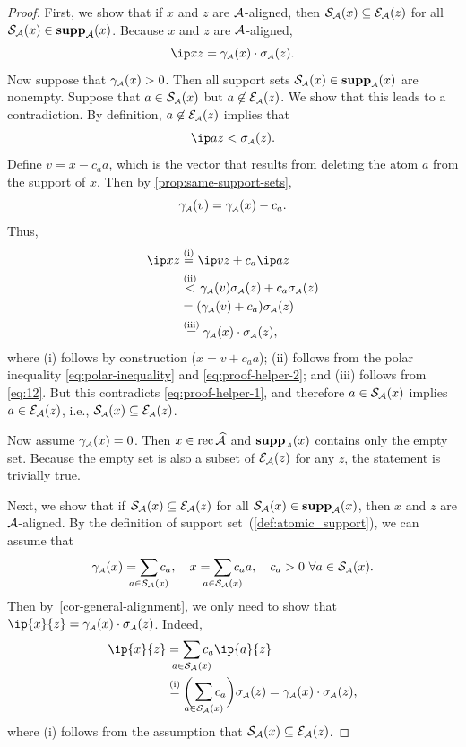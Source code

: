 \begin{proof}
  First, we show that if $x$ and $z$ are $\mathcal{A}$-aligned, then $\mathcal{S}_{\mathcal{A}}(x)
  \subseteq \mathcal{E}_{\mathcal{A}}(z)$ for all $\mathcal{S}_{\mathcal{A}}(x)\in \operatorname{\hbox{\rm\textbf{supp}}}_{\mathcal{A}}(x)$. Because
  $x$ and $z$ are $\mathcal{A}$-aligned,
  \begin{equation}
    \ip x z = \gamma\As(x)\cdot\sigma\As(z).
    \label{eq:proof-helper-1}
  \end{equation}
  Now suppose that $\gamma_{\scriptscriptstyle\mathcal{A}}(x) > 0$. Then all support sets
  $\mathcal{S}_{\scriptscriptstyle\mathcal{A}}(x) \in \operatorname{\hbox{\rm\textbf{supp}}}_{\scriptscriptstyle\mathcal{A}}(x)$ are nonempty. Suppose that
  $a\in \mathcal{S}_{\scriptscriptstyle\mathcal{A}}(x)$ but $a\not \in\mathcal{E}_{\scriptscriptstyle\mathcal{A}}(z)$. We show that
  this leads to a contradiction. By definition, $a\not\in\mathcal{E}_{\scriptscriptstyle\mathcal{A}}(z)$
  implies that
  \begin{equation}
    \ip a z < \sigma\As(z).
    \label{eq:proof-helper-2}
  \end{equation}
  Define $v = x - c_a a$, which is the vector that results from
  deleting the atom $a$ from the support of $x$. Then by
  \autoref{prop:same-support-sets},
  \begin{equation} \label{eq:12}
    \gamma_{\scriptscriptstyle\mathcal{A}}(v) = \gamma_{\scriptscriptstyle\mathcal{A}}(x) - c_a.
  \end{equation}
  Thus,
  \begin{align*}
    \ip x z
      &\overset{\rm(i)}{=} \ip v z + c_a\ip a z
    \\&\overset{\rm(ii)}{<}\gamma\As(v) \sigma\As(z) + c_a\sigma\As(z)
    \\&= (\gamma\As(v) + c_a) \sigma\As(z)
    \\&\overset{\rm(iii)}{=} \gamma\As(x)\cdot \sigma\As(z),
  \end{align*}
  where (i) follows by construction ($x = v + c_a a$); (ii) follows
  from the polar inequality \eqref{eq:polar-inequality} and
  \eqref{eq:proof-helper-2}; and (iii) follows from \eqref{eq:12}. But
  this contradicts \eqref{eq:proof-helper-1}, and therefore
  $a\in\mathcal{S}_{\mathcal{A}}(x)$ implies $ a\in \mathcal{E}_{\mathcal{A}}(z)$, i.e.,
  $\operatorname{\mathcal{S}_{\scriptscriptstyle\mathcal{A}}}(x)\subseteq\mathcal{E}_{\scriptscriptstyle\mathcal{A}}(z)$.
  
  Now assume  $\gamma_{\scriptscriptstyle\mathcal{A}}(x)=0$. Then $x\in\operatorname{rec}\widehat{\mathcal{A}}$ and $\operatorname{\hbox{\rm\textbf{supp}}}_{\scriptscriptstyle\mathcal{A}} (x)$
  contains only the empty set. Because the empty set is also a subset of
  $\mathcal{E}_{\mathcal{A}}(z)$ for any $z$, the statement is trivially true. 

  Next, we show that if $\mathcal{S}_{\mathcal{A}}(x) \subseteq \mathcal{E}_{\mathcal{A}}(z)$ for all
  $\mathcal{S}_{\mathcal{A}}(x)\in \operatorname{\hbox{\rm\textbf{supp}}}_{\mathcal{A}}(x)$, then $x$ and $z$ are $\mathcal{A}$-aligned. By
  the definition of support set~(\autoref{def:atomic_support}), we can assume that 
  \[
    \gauge\As(x) = \sum_{\mathclap{a\in\suppa(x)}} c_a,
    \quad x = \sum_{\mathclap{a\in\suppa(x)}} c_aa,
    \quad c_a > 0\ \forall a\in\suppa(x).
  \]
  Then by~\autoref{cor-general-alignment}, we only need to show that $\ip{x}{z} =
  \gauge\As(x)\cdot\sigma\As(z)$. Indeed, 
  \begin{align*}
    \ip{x}{z}
      &= \sum_{\mathclap{a\in\suppa(x)}}c_a\ip{a}{z}
    \\&\overset{\rm(i)}{=} \bigg(\sum_{\mathclap{a\in\suppa(x)}}c_a\bigg)\sigma\As(z)
    = \gauge\As(x)\cdot\sigma\As(z),
  \end{align*}
  where (i) follows from the assumption that $\mathcal{S}_{\mathcal{A}}(x) \subseteq \mathcal{E}_{\mathcal{A}}(z)$. 
\end{proof}


